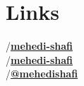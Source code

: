 \section{Links} 

{\github\quad/}\href{https://github.com/mehedi-shafi}{\bf mehedi-shafi} \\
{\linkedin\quad/}\href{https://www.linkedin.com/in/mehedi-shafi/}{\bf mehedi-shafi} \\
{\twitter\quad/}\href{https://twitter.com/mehedishafi}{\bf @mehedishafi} \\

\sectionspace %